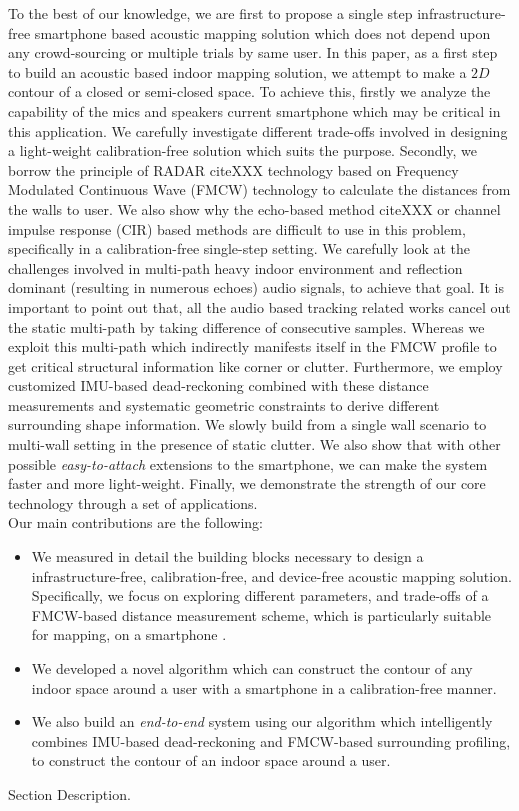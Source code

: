 To the best of our knowledge, we are first to propose a single step infrastructure-free smartphone based acoustic mapping solution which does not depend upon any crowd-sourcing or multiple trials by same user. In this paper, as a first step to build an acoustic based indoor mapping solution, we attempt to make a $2D$ contour of a closed or semi-closed space. To achieve this, firstly we analyze the capability of the mics and speakers current smartphone which may be critical in this application. We carefully investigate different trade-offs involved in designing a light-weight calibration-free solution which suits the purpose. Secondly, we borrow the principle of RADAR citeXXX technology based on Frequency Modulated Continuous Wave (FMCW) technology to calculate the distances from the walls to user. We also show why the echo-based method citeXXX or channel impulse response (CIR) based methods are difficult to use in this problem, specifically in a calibration-free single-step setting. We carefully look at the challenges involved in multi-path heavy indoor environment and reflection dominant (resulting in numerous echoes) audio signals, to achieve that goal. It is important to point out that, all the audio based tracking related works \cite{fingerio,aamouse,cat} cancel out the static multi-path by taking difference of consecutive samples. Whereas we exploit this multi-path which indirectly manifests itself in the FMCW profile to get critical structural information like corner or clutter. Furthermore, we employ customized IMU-based dead-reckoning combined with these distance measurements and systematic geometric constraints to derive different surrounding shape information. We slowly build from a single wall scenario to multi-wall setting in the presence of static clutter. We also show that with other possible \textit{easy-to-attach} extensions to the smartphone, we can make the system faster and more light-weight. Finally, we demonstrate the strength of our core technology through a set of applications. \\
 
Our main contributions are the following:
\begin{itemize}
\item We measured in detail the building blocks necessary to design a infrastructure-free, calibration-free, and device-free acoustic mapping solution. Specifically, we focus on exploring different parameters, and trade-offs of a FMCW-based distance measurement scheme, which is particularly suitable for mapping, on a smartphone .
\item We developed a novel algorithm which can construct the contour of any indoor space around a user with a smartphone in a calibration-free manner.
\item We also build an \textit{end-to-end} system using our algorithm which intelligently combines IMU-based dead-reckoning and FMCW-based surrounding profiling, to construct the contour of an indoor space around a user.
\end{itemize}

Section Description.\\

 
 
 
 
